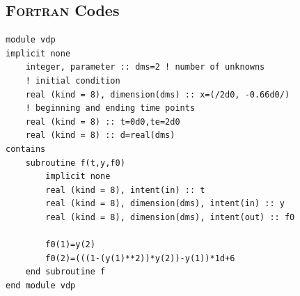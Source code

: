 \documentclass[a4paper,oneside]{book}
\numberwithin{equation}{chapter}
\begin{document}
\subsection{\textsc{Fortran} Codes}
\begin{lstlisting}
module vdp  
implicit none 
	integer, parameter :: dms=2 ! number of unknowns
    ! initial condition
	real (kind = 8), dimension(dms) :: x=(/2d0, -0.66d0/) 
    ! beginning and ending time points
	real (kind = 8) :: t=0d0,te=2d0 
	real (kind = 8) :: d=real(dms)
contains      
	subroutine f(t,y,f0)
		implicit none
		real (kind = 8), intent(in) :: t
		real (kind = 8), dimension(dms), intent(in) :: y
		real (kind = 8), dimension(dms), intent(out) :: f0
		
		f0(1)=y(2)
		f0(2)=(((1-(y(1)**2))*y(2))-y(1))*1d+6
	end subroutine f
end module vdp 
\end{lstlisting}
\end{document}
